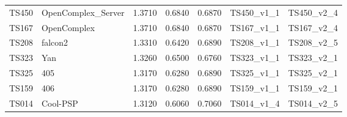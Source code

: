 \begin{table}[ht]
{\begin{tabular}{llrrrll}
TS450 & OpenComplex\_Server & 1.3710 & 0.6840 & 0.6870 & TS450\_v1\_1 & TS450\_v2\_4 \\ 
TS167 & OpenComplex & 1.3710 & 0.6840 & 0.6870 & TS167\_v1\_1 & TS167\_v2\_4 \\ 
TS208 & falcon2 & 1.3310 & 0.6420 & 0.6890 & TS208\_v1\_1 & TS208\_v2\_5 \\ 
TS323 & Yan & 1.3260 & 0.6500 & 0.6760 & TS323\_v1\_1 & TS323\_v2\_1 \\ 
TS325 & 405 & 1.3170 & 0.6280 & 0.6890 & TS325\_v1\_1 & TS325\_v2\_1 \\ 
TS159 & 406 & 1.3170 & 0.6280 & 0.6890 & TS159\_v1\_1 & TS159\_v2\_1 \\ 
TS014 & Cool-PSP & 1.3120 & 0.6060 & 0.7060 & TS014\_v1\_4 & TS014\_v2\_5 \\ 
\bottomrule
\end{tabular}%
}
\end{table}
